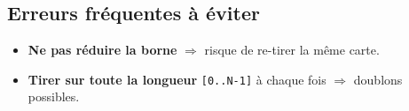 






\subsection*{Erreurs fréquentes à éviter}
\begin{itemize}
  \item \textbf{Ne pas réduire la borne} $\Rightarrow$ risque de re-tirer la même carte.
  \item \textbf{Tirer sur toute la longueur} \texttt{[0..N-1]} à chaque fois $\Rightarrow$ doublons possibles.
  \end{itemize}
